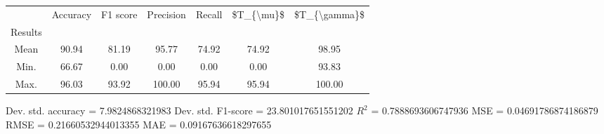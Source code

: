 \begin{tabular}{|c|c|c|c|c|c|c|}
\toprule
{} &  Accuracy &  F1 score &  Precision &  Recall &  \$T\_\{\textbackslash mu\}\$ &  \$T\_\{\textbackslash gamma\}\$ \\
Results &           &           &            &         &            &               \\
\hline
Mean    &     90.94 &     81.19 &      95.77 &   74.92 &      74.92 &         98.95 \\
Min.    &     66.67 &      0.00 &       0.00 &    0.00 &       0.00 &         93.83 \\
Max.    &     96.03 &     93.92 &     100.00 &   95.94 &      95.94 &        100.00 \\
\bottomrule
\end{tabular}

 Dev. std. accuracy = 7.9824868321983
 Dev. std. F1-score = 23.801017651551202
 $R^2$ = 0.7888693606747936
 MSE = 0.04691786874186879
 RMSE = 0.21660532944013355
 MAE = 0.09167636618297655